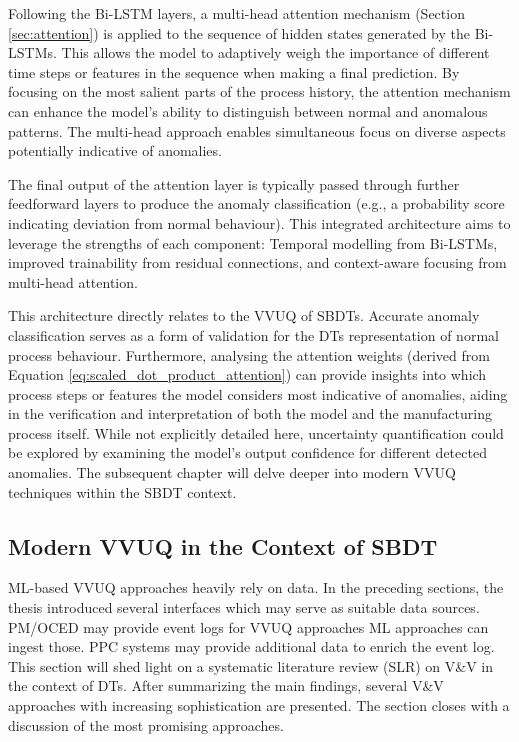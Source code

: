 Following the Bi-LSTM layers, a multi-head attention mechanism (Section \autoref{sec:attention}) is applied to the sequence of hidden states generated by the Bi-LSTMs. This allows the model to adaptively weigh the importance of different time steps or features in the sequence when making a final prediction. By focusing on the most salient parts of the process history, the attention mechanism can enhance the model's ability to distinguish between normal and anomalous patterns. The multi-head approach enables simultaneous focus on diverse aspects potentially indicative of anomalies.

The final output of the attention layer is typically passed through further feedforward layers to produce the anomaly classification (e.g., a probability score indicating deviation from normal behaviour). This integrated architecture aims to leverage the strengths of each component: Temporal modelling from Bi-LSTMs, improved trainability from residual connections, and context-aware focusing from multi-head attention.

This architecture directly relates to the VVUQ of SBDTs. Accurate anomaly classification serves as a form of validation for the DTs representation of normal process behaviour. Furthermore, analysing the attention weights (derived from Equation \autoref{eq:scaled_dot_product_attention}) can provide insights into which process steps or features the model considers most indicative of anomalies, aiding in the verification and interpretation of both the model and the manufacturing process itself. While not explicitly detailed here, uncertainty quantification could be explored by examining the model's output confidence for different detected anomalies. The subsequent chapter will delve deeper into modern VVUQ techniques within the SBDT context.


\subsection{Modern VVUQ in the Context of SBDT}
\label{sec:vvuq-dt}
ML-based VVUQ approaches heavily rely on data. In the preceding sections, the thesis introduced several interfaces which may serve as suitable data sources. PM/OCED may provide event logs for VVUQ approaches \textemdash ML approaches can ingest those. PPC systems may provide additional data to enrich the event log. This section will shed light on a systematic literature review (SLR) on V&V in the context of DTs. After summarizing the main findings, several V&V approaches with increasing sophistication are presented. The section closes with a discussion of the most promising approaches.


